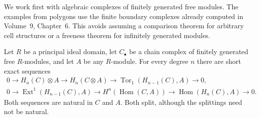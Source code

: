 We work first with algebraic complexes of finitely generated free modules. The examples from polygons use the finite boundary complexes already computed in Volume~9, Chapter~6. This avoids assuming a comparison theorem for arbitrary cell structures or a freeness theorem for infinitely generated modules.

\begin{theorem}\label{thm:uct}
Let $R$ be a principal ideal domain, let $C_\bullet$ be a chain complex of finitely generated free $R$-modules, and let $A$ be any $R$-module. For every degree $n$ there are short exact sequences
\[
\begin{gathered}
0\to H_n(C)\otimes A\to H_n(C\otimes A)
\to\operatorname{Tor}_1(H_{n-1}(C),A)\to0,\\[2pt]
0\to\operatorname{Ext}^1(H_{n-1}(C),A)
\to H^n(\operatorname{Hom}(C,A))
\to\operatorname{Hom}(H_n(C),A)\to0.
\end{gathered}
\]
Both sequences are natural in $C$ and $A$. Both split, although the splittings need not be natural.
\end{theorem}


